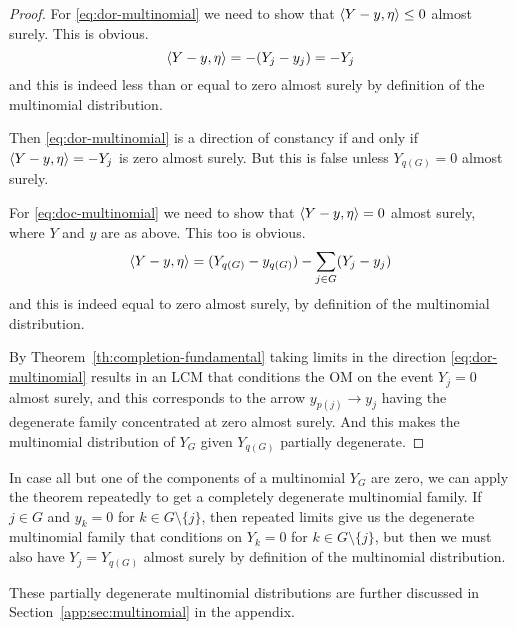 \begin{proof}
For \eqref{eq:dor-multinomial} we need to show
that $\langle Y - y, \eta \rangle \le 0$ almost surely.
This is obvious.
$$
   \langle Y - y, \eta \rangle = - (Y_j - y_j)
   =
   - Y_j
$$
and this is indeed less than or equal to zero almost surely
by definition of the multinomial distribution.

Then \eqref{eq:dor-multinomial} is a direction of constancy if and only if
$\langle Y - y, \eta \rangle = - Y_j$ is zero almost surely.  But this is false
unless $Y_{q(G)} = 0$ almost surely.

For \eqref{eq:doc-multinomial} we need to show
that $\langle Y - y, \eta \rangle = 0$ almost surely,
where $Y$ and $y$ are as above.
This too is obvious.
$$
   \langle Y - y, \eta \rangle = (Y_{q(G)} - y_{q(G)}) - \sum_{j \in G} (Y_j - y_j)
$$
and this is indeed equal to zero almost surely,
by definition of the multinomial distribution.

By Theorem~\ref{th:completion-fundamental} taking limits in the direction
\eqref{eq:dor-multinomial} results in an LCM that conditions the OM on
the event $Y_j = 0$ almost surely, and this corresponds to
the arrow $y_{p(j)} \longrightarrow y_j$ having the degenerate family
concentrated at zero almost surely.  And this makes the multinomial
distribution of $Y_G$ given $Y_{q(G)}$ partially degenerate.
\end{proof}

In case all but one of the components of a multinomial $Y_G$ are zero,
we can apply the theorem repeatedly to get a completely degenerate
multinomial family.  If $j \in G$ and $y_k = 0$ for $k \in G \setminus \{j\}$,
then repeated limits give us the degenerate multinomial family that
conditions on $Y_k = 0$ for $k \in G \setminus \{j\}$, but then we must
also have $Y_j = Y_{q(G)}$ almost surely by definition of the multinomial
distribution.

These partially degenerate multinomial distributions are further
discussed in Section~\ref{app:sec:multinomial} in the appendix.

